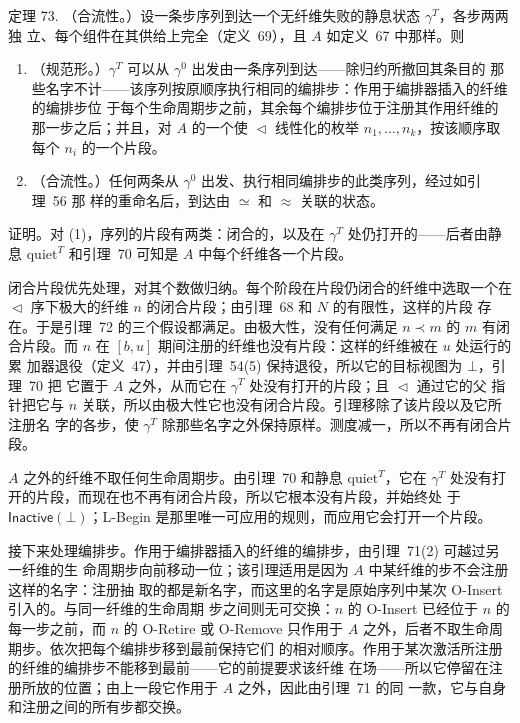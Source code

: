 \documentclass[
  10
]{article}
\begin{document}
定理 73. （合流性。）设一条步序列到达一个无纤维失败的静息状态 \(\gamma^{T}\)，各步两两独
立、每个组件在其供给上完全（定义~69），且 \(A\) 如定义~67 中那样。则

\begin{enumerate}
\def\labelenumi{\arabic{enumi}.}
\item
  （规范形。）\(\gamma^{T}\) 可以从 \(\gamma^{0}\) 出发由一条序列到达——除归约所撤回其条目的
  那些名字不计——该序列按原顺序执行相同的编排步：作用于编排器插入的纤维的编排步位
  于每个生命周期步之前，其余每个编排步位于注册其作用纤维的那一步之后；并且，对
  \(A\) 的一个使 \(\vartriangleleft\) 线性化的枚举 \(n_{1}, \ldots, n_{k}\)，按该顺序取每个
  \(n_{i}\) 的一个片段。
\item
  （合流性。）任何两条从 \(\gamma^{0}\) 出发、执行相同编排步的此类序列，经过如引理~56 那
  样的重命名后，到达由 \(\simeq\) 和 \(\approx\) 关联的状态。
\end{enumerate}

证明。对 (1)，序列的片段有两类：闭合的，以及在 \(\gamma^{T}\) 处仍打开的——后者由静息
\(\mathrm{quiet}^{T}\) 和引理~70 可知是 \(A\) 中每个纤维各一个片段。

闭合片段优先处理，对其个数做归纳。每个阶段在片段仍闭合的纤维中选取一个在
\(\vartriangleleft\) 序下极大的纤维 \(n\) 的闭合片段；由引理~68 和 \(N\) 的有限性，这样的片段
存在。于是引理~72 的三个假设都满足。由极大性，没有任何满足 \(n \prec m\) 的 \(m\) 有闭
合片段。而 \(n\) 在 \([b, u]\) 期间注册的纤维也没有片段：这样的纤维被在 \(u\) 处运行的累
加器退役（定义~47），并由引理~54(5) 保持退役，所以它的目标视图为 \(\bot\)，引理~70 把
它置于 \(A\) 之外，从而它在 \(\gamma^{T}\) 处没有打开的片段；且 \(\vartriangleleft\) 通过它的父
指针把它与 \(n\) 关联，所以由极大性它也没有闭合片段。引理移除了该片段以及它所注册名
字的各步，使 \(\gamma^{T}\) 除那些名字之外保持原样。测度减一，所以不再有闭合片段。

\(A\) 之外的纤维不取任何生命周期步。由引理~70 和静息 \(\mathrm{quiet}^{T}\)，它在
\(\gamma^{T}\) 处没有打开的片段，而现在也不再有闭合片段，所以它根本没有片段，并始终处
于 \(\mathsf{Inactive}(\bot)\)；L-Begin 是那里唯一可应用的规则，而应用它会打开一个片段。

接下来处理编排步。作用于编排器插入的纤维的编排步，由引理~71(2) 可越过另一纤维的生
命周期步向前移动一位；该引理适用是因为 \(A\) 中某纤维的步不会注册这样的名字：注册抽
取的都是新名字，而这里的名字是原始序列中某次 O-Insert 引入的。与同一纤维的生命周期
步之间则无可交换：\(n\) 的 O-Insert 已经位于 \(n\) 的每一步之前，而 \(n\) 的 O-Retire 或
O-Remove 只作用于 \(A\) 之外，后者不取生命周期步。依次把每个编排步移到最前保持它们
的相对顺序。作用于某次激活所注册的纤维的编排步不能移到最前——它的前提要求该纤维
在场——所以它停留在注册所放的位置；由上一段它作用于 \(A\) 之外，因此由引理~71 的同
一款，它与自身和注册之间的所有步都交换。
\end{document}
